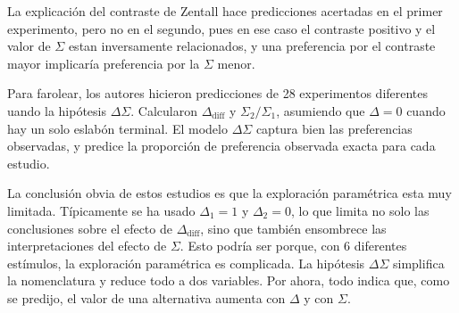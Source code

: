 \documentclass[a4paper,12pt]{article}
\begin{document}
La explicación del contraste de Zentall hace predicciones acertadas en el primer experimento, pero no en el segundo, pues en ese caso el contraste positivo y el valor de $\Sigma$ estan inversamente relacionados, y una preferencia por el contraste mayor implicaría preferencia por la $\Sigma$ menor.

Para farolear, los autores hicieron predicciones de 28 experimentos diferentes uando la hipótesis $\Delta\Sigma$. Calcularon $\Delta_{\mbox{diff}}$ y $\Sigma_2/\Sigma_1$, asumiendo que $\Delta=0$ cuando hay un solo eslabón terminal. El modelo $\Delta\Sigma$ captura bien las preferencias observadas, y predice la proporción de preferencia observada exacta para cada estudio.

La conclusión obvia de estos estudios es que la exploración paramétrica esta muy limitada. Típicamente se ha usado $\Delta_1=1$ y $\Delta_2=0$, lo que limita no solo las conclusiones sobre el efecto de $\Delta_{\mbox{diff}}$, sino que también ensombrece las interpretaciones del efecto de $\Sigma$. Esto podría ser porque, con 6 diferentes estímulos, la exploración paramétrica es complicada. La hipótesis $\Delta\Sigma$ simplifica la nomenclatura y reduce todo a dos variables. Por ahora, todo indica que, como se predijo, el valor de una alternativa aumenta con $\Delta$ y con $\Sigma$.
\end{document}
